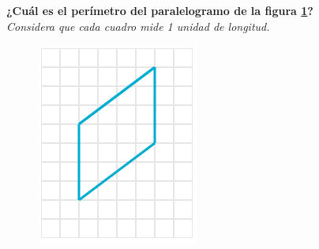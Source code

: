 \textbf{¿Cuál es el perímetro del paralelogramo de la figura \ref{fig:peri_paralelogramo_01}?}\\
\emph{Considera que cada cuadro mide 1 unidad de longitud.}

\begin{figure}[H]
    \centering
    \includegraphics[width=0.25\linewidth]{../images/peri_paralelogramo_01.png}
    \caption{}
    \label{fig:peri_paralelogramo_01}
\end{figure}

